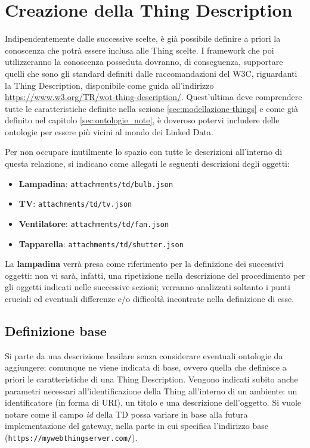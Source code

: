 \documentclass[12pt,a4paper,openright,oneside]{report}
\begin{document}
\section{Creazione della Thing Description}
Indipendentemente dalle successive scelte, è già possibile definire a priori la conoscenza che potrà essere inclusa alle Thing scelte. I framework che poi utilizzeranno la conoscenza posseduta dovranno, di conseguenza, supportare quelli che sono gli standard definiti dalle raccomandazioni del W3C, riguardanti la Thing Description, disponibile come guida all'indirizzo \url{https://www.w3.org/TR/wot-thing-description/}. Quest'ultima deve comprendere tutte le caratteristiche definite nella sezione \ref{sec:modellazione-things} e come già definito nel capitolo \ref{sec:ontologie_note}, è doveroso potervi includere delle ontologie per essere più vicini al mondo dei Linked Data.

Per non occupare inutilmente lo spazio con tutte le descrizioni all'interno di questa relazione, si indicano come allegati le seguenti descrizioni degli oggetti:

\begin{itemize}
	\setlength\itemsep{-0.3em}
	\item \textbf{Lampadina}: \texttt{attachments/td/bulb.json}
	\item \textbf{TV}: \texttt{attachments/td/tv.json}
	\item \textbf{Ventilatore}: \texttt{attachments/td/fan.json}
	\item \textbf{Tapparella}: \texttt{attachments/td/shutter.json}
\end{itemize}

La \textbf{lampadina} verrà presa come riferimento per la definizione dei successivi oggetti: non vi sarà, infatti, una ripetizione nella descrizione del procedimento per gli oggetti indicati nelle successive sezioni; verranno analizzati soltanto i punti cruciali ed eventuali differenze e/o difficoltà incontrate nella definizione di esse.

\subsection{Definizione base}
Si parte da una descrizione basilare senza considerare eventuali ontologie da aggiungere; comunque ne viene indicata di base, ovvero quella che definisce a priori le caratteristiche di una Thing Description. Vengono indicati subito anche parametri necessari all'identificazione della Thing all'interno di un ambiente: un identificatore (in forma di URI), un titolo e una descrizione dell'oggetto. Si vuole notare come il campo \textit{id} della TD possa variare in base alla futura implementazione del gateway, nella parte in cui specifica l'indirizzo base (\texttt{https://mywebthingserver.com/}).\\
\end{document}
